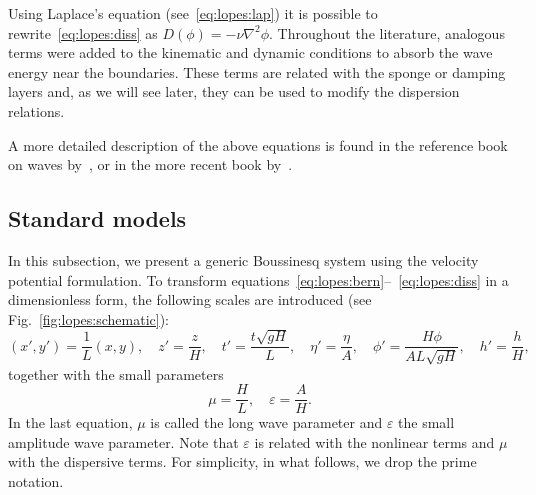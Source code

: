 Using Laplace's equation (see~\eqref{eq:lopes:lap}) it
is possible to rewrite~\eqref{eq:lopes:diss} as
$D(\phi)=-\nu\nabla^2\phi$.  Throughout the literature,
analogous terms were added to the kinematic and dynamic
conditions to absorb the wave energy near the boundaries.
These terms are related with the sponge or damping layers
and, as we will see later, they can be used to modify the
dispersion relations.

A more detailed description of the above equations is found
in the reference book on waves by~\cite{Whitham1974}, or in
the more recent book by~\cite{Johnson1997}.

\subsection{Standard models}
In this subsection, we present a generic Boussinesq system
using the velocity potential formulation.  To transform
equations~\eqref{eq:lopes:bern}--~\eqref{eq:lopes:diss}
in a dimensionless form, the following scales are
introduced (see Fig.~\ref{fig:lopes:schematic}):
\begin{equation}
( x', y')=\frac{1}{L}(x,y),\quad z'=\frac{z}{H}, \quad
  t'=\frac{t\sqrt{gH}}{L},\quad \eta'=\frac{\eta}{A},\quad
  \phi'= \frac{H\phi}{AL\sqrt{gH}},\quad h'=\frac{h}{H},
\end{equation}
together with the small parameters
\begin{equation}
\mu=\frac{H}{L},\quad \varepsilon=\frac{A}{H}.
\end{equation}
In the last equation, $\mu$ is called the long wave
parameter and $\varepsilon$ the small amplitude wave
parameter.  Note that $\varepsilon$ is related with the
nonlinear terms and $\mu$ with the dispersive terms.  For
simplicity, in what follows, we drop the prime notation.

